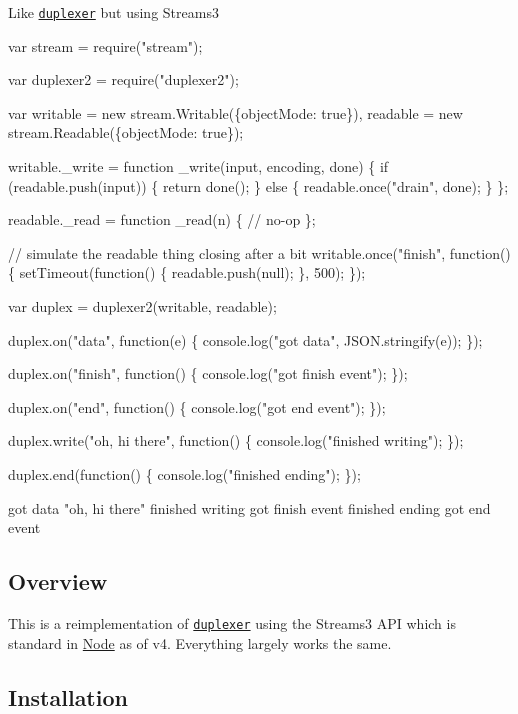 Like \href{https://github.com/Raynos/duplexer}{\tt duplexer} but using Streams3


\begin{DoxyCode}
var stream = require("stream");

var duplexer2 = require("duplexer2");

var writable = new stream.Writable(\{objectMode: true\}),
    readable = new stream.Readable(\{objectMode: true\});

writable.\_write = function \_write(input, encoding, done) \{
  if (readable.push(input)) \{
    return done();
  \} else \{
    readable.once("drain", done);
  \}
\};

readable.\_read = function \_read(n) \{
  // no-op
\};

// simulate the readable thing closing after a bit
writable.once("finish", function() \{
  setTimeout(function() \{
    readable.push(null);
  \}, 500);
\});

var duplex = duplexer2(writable, readable);

duplex.on("data", function(e) \{
  console.log("got data", JSON.stringify(e));
\});

duplex.on("finish", function() \{
  console.log("got finish event");
\});

duplex.on("end", function() \{
  console.log("got end event");
\});

duplex.write("oh, hi there", function() \{
  console.log("finished writing");
\});

duplex.end(function() \{
  console.log("finished ending");
\});
\end{DoxyCode}



\begin{DoxyCode}
got data "oh, hi there"
finished writing
got finish event
finished ending
got end event
\end{DoxyCode}


\subsection*{Overview}

This is a reimplementation of \href{https://www.npmjs.com/package/duplexer}{\tt duplexer} using the Streams3 A\+PI which is standard in \mbox{\hyperlink{classNode}{Node}} as of v4. Everything largely works the same.

\subsection*{Installation}

